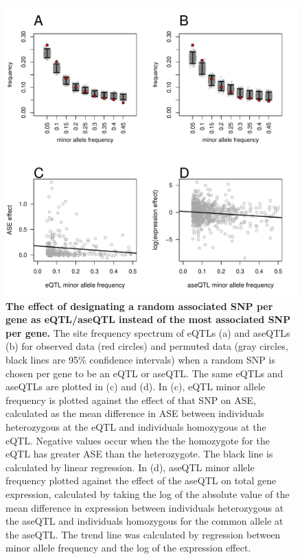 \begin{figure}[ht]
      \centering
       \includegraphics[width=\linewidth]{Ch3FigS4}
    \caption{\textbf{The effect of designating a random associated SNP per gene as eQTL/aseQTL instead of the most associated SNP per gene.} The site frequency spectrum of eQTLs (a) and aseQTLs (b) for observed data (red circles) and permuted data (gray circles, black lines are 95\% confidence intervals) when a random SNP is chosen per gene to be an eQTL or aseQTL. The same eQTLs and aseQTLs are plotted in (c) and (d). In (c), eQTL minor allele frequency is plotted against the effect of that SNP on ASE, calculated as the mean difference in ASE between individuals heterozygous at the eQTL and individuals homozygous at the eQTL. Negative values occur when the the homozygote for the eQTL has greater ASE than the heterozygote. The black line is calculated by linear regression. In (d), aseQTL minor allele frequency plotted against the effect of the aseQTL on total gene expression, calculated by taking the log of the absolute value of the mean difference in expression between individuals heterozygous at the aseQTL and individuals homozygous for the common allele at the aseQTL. The trend line was calculated by regression between minor allele frequency and the log of the expression effect. }
    \label{fig:3figS4}
\end{figure}

